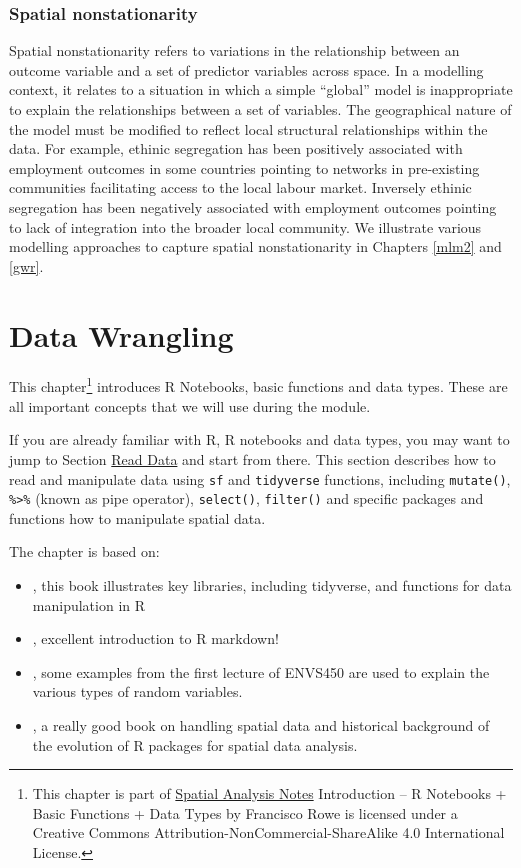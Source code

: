 \documentclass[
]{book}
\begin{document}
\hypertarget{spatial-nonstationarity}{%
\subsection{Spatial nonstationarity}\label{spatial-nonstationarity}}

Spatial nonstationarity refers to variations in the relationship between an outcome variable and a set of predictor variables across space. In a modelling context, it relates to a situation in which a simple ``global'' model is inappropriate to explain the relationships between a set of variables. The geographical nature of the model must be modified to reflect local structural relationships within the data. For example, ethinic segregation has been positively associated with employment outcomes in some countries pointing to networks in pre-existing communities facilitating access to the local labour market. Inversely ethinic segregation has been negatively associated with employment outcomes pointing to lack of integration into the broader local community. We illustrate various modelling approaches to capture spatial nonstationarity in Chapters \ref{mlm2} and \ref{gwr}.

\hypertarget{data_wrangling}{%
\chapter{Data Wrangling}\label{data_wrangling}}

This chapter\footnote{This chapter is part of \href{index.html}{Spatial Analysis Notes} {Introduction -- R Notebooks + Basic Functions + Data Types} by Francisco Rowe is licensed under a Creative Commons Attribution-NonCommercial-ShareAlike 4.0 International License.} introduces R Notebooks, basic functions and data types. These are all important concepts that we will use during the module.

If you are already familiar with R, R notebooks and data types, you may want to jump to Section \protect\hyperlink{sec_readdata}{Read Data} and start from there. This section describes how to read and manipulate data using \texttt{sf} and \texttt{tidyverse} functions, including \texttt{mutate()}, \texttt{\%\textgreater{}\%} (known as pipe operator), \texttt{select()}, \texttt{filter()} and specific packages and functions how to manipulate spatial data.

The chapter is based on:

\begin{itemize}
\item
  \citet{grolemund_wickham_2019_book}, this book illustrates key libraries, including tidyverse, and functions for data manipulation in R
\item
  \citet{Xie_et_al_2019_book}, excellent introduction to R markdown!
\item
  \citet{envs450_2018}, some examples from the first lecture of ENVS450 are used to explain the various types of random variables.
\item
  \citet{Lovelace_et_al_2020_book}, a really good book on handling spatial data and historical background of the evolution of R packages for spatial data analysis.
\end{itemize}
\end{document}
